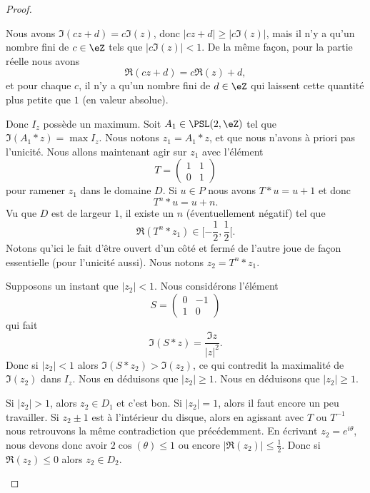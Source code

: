 \begin{proof}
\begin{subproof}
		Nous avons \( \Im(cz+d)=c\Im(z)\), donc \( | cz+d |\geq |c \Im(z) |\), mais il n'y a qu'un nombre fini de \( c\in \eZ\) tels que \( | c\Im(z) |<1\). De la même façon, pour la partie réelle nous avons
		\begin{equation}
			\Re(cz+d)=c\Re(z)+d,
		\end{equation}
		et pour chaque \( c\),  il n'y a qu'un nombre fini de \( d\in \eZ\) qui laissent cette quantité plus petite que \( 1\) (en valeur absolue).

		Donc \( I_z\) possède un maximum. Soit \( A_1\in\PSL(2,\eZ)\) tel que \( \Im(A_1*z)=\max I_z\). Nous notons \( z_1=A_1*z\), et que nous n'avons à priori pas l'unicité. Nous allons maintenant agir sur \( z_1\) avec l'élément
		\begin{equation}
			T=\begin{pmatrix}
				1 & 1 \\
				0 & 1
			\end{pmatrix}
		\end{equation}
		pour ramener \( z_1\) dans le domaine \( D\). Si \( u\in P\) nous avons \( T*u=u+1\) et donc
		\begin{equation}
			T^n*u=u+n.
		\end{equation}
		Vu que \( D\) est de largeur \( 1\), il existe un \( n\) (éventuellement négatif) tel que
		\begin{equation}
			\Re(T^n*z_1)\in\mathopen[ -\frac{ 1 }{2} , \frac{ 1 }{2} [.
		\end{equation}
		Notons qu'ici le fait d'être ouvert d'un côté et fermé de l'autre joue de façon essentielle (pour l'unicité aussi). Nous notons \( z_2=T^n*z_1\).

		Supposons un instant que \( | z_2 |<1\). Nous considérons l'élément
		\begin{equation}
			S=\begin{pmatrix}
				0 & -1 \\
				1 & 0
			\end{pmatrix}
		\end{equation}
		qui fait
		\begin{equation}
			\Im(S*z)=\frac{ \Im z }{| z |^2}.
		\end{equation}
		Donc si \( | z_2 |<1\) alors \( \Im(S*z_2)>\Im(z_2)\), ce qui contredit la maximalité de \( \Im(z_2)\) dans \( I_z\). Nous en déduisons que \( | z_2 |\geq 1\). Nous en déduisons que \( | z_2 |\geq 1\).

		Si \( | z_2 |>1\), alors \( z_2\in D_1\) et c'est bon. Si \( | z_2 |=1\), alors il faut encore un peu travailler. Si \( z_2\pm 1\) est à l'intérieur du disque, alors en agissant avec \( T\) ou \( T^{-1}\) nous retrouvons la même contradiction que précédemment. En écrivant \( z_2= e^{i\theta}\), nous devons donc avoir \( 2\cos(\theta)\leq 1\) ou encore \( |\Re(z_2)|\leq \frac{ 1 }{2}\). Donc si \( \Re(z_2)\leq 0\) alors \( z_2\in D_2\).


\end{subproof}
\end{proof}
